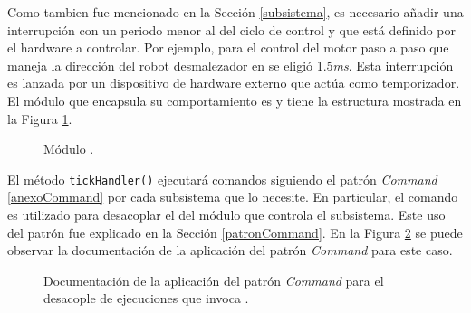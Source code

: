 
Como tambien fue mencionado en la Sección \ref{subsistema}, es necesario añadir una interrupción con un periodo menor al del ciclo de control y que está definido por el hardware a controlar. Por ejemplo, para el control del motor paso a paso que maneja la dirección del robot desmalezador en \cite{paperPomponio} se eligió 1.5\textit{ms}. Esta interrupción es lanzada por un dispositivo de hardware externo que actúa como temporizador. El módulo que encapsula su comportamiento es \Timer y tiene la estructura mostrada en la Figura \ref{moduloTimer}.

\begin{figure}[H]
\caption{Módulo \Timer.}
\label{moduloTimer}
\begin{center}
\end{center}
\end{figure}

El método \verb|tickHandler()| ejecutará comandos siguiendo el patrón \textit{Command} \ref{anexoCommand} por cada subsistema que lo necesite. En particular, el comando es utilizado para desacoplar el \Timer del módulo que controla el subsistema. Este uso del patrón fue explicado en la Sección \ref{patronCommand}. En la Figura \ref{docCommandTimer} se puede observar la documentación de la aplicación del patrón \textit{Command} para este caso.

\begin{figure}[H]
\caption{Documentación de la aplicación del patrón \textit{Command} para el desacople de ejecuciones que invoca \Timer.}
\label{docCommandTimer}
\end{figure}

